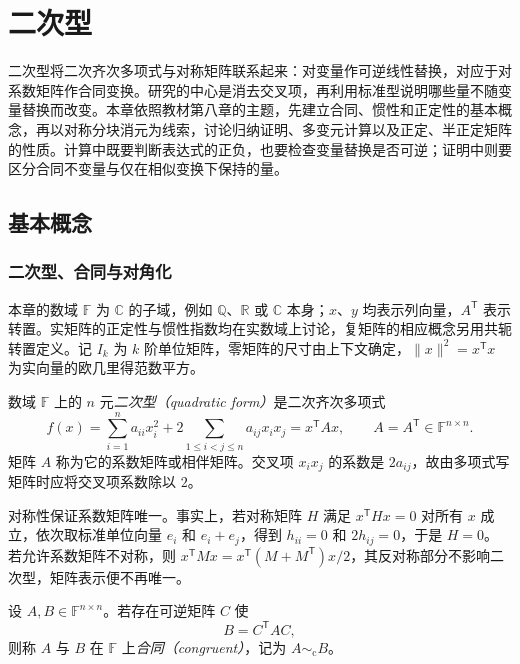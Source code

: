 \setcounter{chapter}{7} %
\chapter{二次型}
\label{chap:xie-ex-quadratic-forms}

二次型将二次齐次多项式与对称矩阵联系起来：对变量作可逆线性替换，对应于对系数矩阵作合同变换。研究的中心是消去交叉项，再利用标准型说明哪些量不随变量替换而改变。本章依照教材第八章的主题，先建立合同、惯性和正定性的基本概念，再以对称分块消元为线索，讨论归纳证明、多变元计算以及正定、半正定矩阵的性质。计算中既要判断表达式的正负，也要检查变量替换是否可逆；证明中则要区分合同不变量与仅在相似变换下保持的量。

\section{基本概念}
\label{sec:xie-ex-qf-basics}

\subsection{二次型、合同与对角化}

本章的数域 $\mathbb F$ 为 $\mathbb C$ 的子域，例如 $\mathbb Q$、$\mathbb R$ 或 $\mathbb C$ 本身；$x$、$y$ 均表示列向量，$A^{\mathsf T}$ 表示转置。实矩阵的正定性与惯性指数均在实数域上讨论，复矩阵的相应概念另用共轭转置定义。记 $I_k$ 为 $k$ 阶单位矩阵，零矩阵的尺寸由上下文确定，$\|x\|^2=x^{\mathsf T}x$ 为实向量的欧几里得范数平方。

\begin{definition}
数域 $\mathbb F$ 上的 $n$ 元\emph{二次型（quadratic form）}是二次齐次多项式
\[
 f(x)=\sum_{i=1}^n a_{ii}x_i^2+2\sum_{1\le i<j\le n}a_{ij}x_ix_j
     =x^{\mathsf T}Ax,
 \qquad A=A^{\mathsf T}\in\mathbb F^{n\times n}.
\]
矩阵 $A$ 称为它的系数矩阵或相伴矩阵。交叉项 $x_ix_j$ 的系数是 $2a_{ij}$，故由多项式写矩阵时应将交叉项系数除以 $2$。
\end{definition}

对称性保证系数矩阵唯一。事实上，若对称矩阵 $H$ 满足 $x^{\mathsf T}Hx=0$ 对所有 $x$ 成立，依次取标准单位向量 $e_i$ 和 $e_i+e_j$，得到 $h_{ii}=0$ 和 $2h_{ij}=0$，于是 $H=0$。若允许系数矩阵不对称，则 $x^{\mathsf T}Mx=x^{\mathsf T}(M+M^{\mathsf T})x/2$，其反对称部分不影响二次型，矩阵表示便不再唯一。

\begin{definition}
设 $A,B\in\mathbb F^{n\times n}$。若存在可逆矩阵 $C$ 使
\begin{equation}
 B=C^{\mathsf T}AC,
 \label{eq:xie-ex-qf-congruence}
\end{equation}
则称 $A$ 与 $B$ 在 $\mathbb F$ 上\emph{合同（congruent）}，记为 $A\sim_{\mathrm c}B$。
\end{definition}

